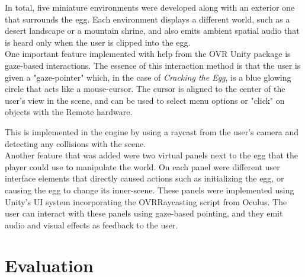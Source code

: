\documentclass[10pt,twocolumn,letterpaper]{article}
\begin{document}
In total, five miniature environments were developed along with an exterior one that surrounds the egg. Each environment displays a different world, such as a desert landscape or a mountain shrine, and also emits ambient spatial audio that is heard only when the user is clipped into the egg.\\

One important feature implemented with help from the OVR Unity package is gaze-based interactions. The essence of this interaction method is that the user is given a "gaze-pointer" which, in the case of \textit{Cracking the Egg}, is a blue glowing circle that acts like a mouse-cursor. The cursor is aligned to the center of the user's view in the scene, and can be used to select menu options or "click" on objects with the Remote hardware.

This is implemented in the engine by using a raycast from the user's camera and detecting any collisions with the scene.\\

Another feature that was added were two virtual panels next to the egg that the player could use to manipulate the world. On each panel were different user interface elements that directly caused actions such as initializing the egg, or causing the egg to change its inner-scene. These panels were implemented using Unity's UI system incorporating the OVRRaycasting script from Oculus. The user can interact with these panels using gaze-based pointing, and they emit audio and visual effects as feedback to the user.



\section{Evaluation}
\end{document}
